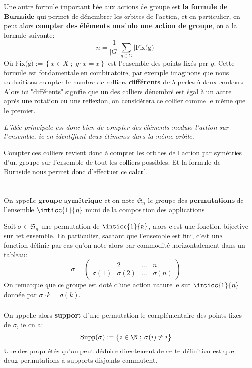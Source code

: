 \subsection*{}
Une autre formule important liée aux actions de groupe est \textbf{la formule de Burnside} qui permet de dénombrer les orbites de l'action, et en particulier, on peut alors \textbf{compter des éléments modulo une action de groupe}, on a la formule suivante:
\[ 
   n = \frac{1}{|G|} \sum_{g \in G} |\text{Fix(g)}| 
\]
Où \( \text{Fix(g)} := \left\{x \in X \; ; \; g \cdot x = x \right\}\) est l'ensemble des points fixés par \( g \). Cette formule est fondamentale en combinatoire, par exemple imaginons que nous souhaitions compter le nombre de colliers \textbf{différents} de 5 perles à deux couleurs. Alors ici "différents" signifie que un des colliers dénombré est égal à un autre aprés une rotation ou une reflexion, on considèrera ce collier comme le même que le premier. 
\begin{center}
   \textit{L'idée principale est donc bien de compter des éléments modulo l'action sur l'ensemble, ie en identifiant deux éléments dans la même orbite.}
\end{center}
Compter ces colliers revient donc à compter les orbites de l'action par symétries d'un groupe sur l'ensemble de tout les colliers possibles. Et la formule de Burnside nous permet donc d'effectuer ce calcul.
\chapter*{}
On appelle \textbf{groupe symétrique} et on note \(\mathfrak{S}_n\) le groupe des \textbf{permutations} de l'ensemble \(\inticc{1}{n}\) muni de la composition des applications.\<

Soit \(\sigma \in \mathfrak{S}_n\) une permutation de \(\inticc{1}{n}\), alors c'est une fonction bijective sur cet ensemble. En particulier, sachant que l'ensemble est fini, c'est une fonction définie par cas qu'on note alors par commodité horizontalement dans un tableau:
\[
   \sigma =  \begin{pmatrix}
      1 & 2 & \ldots & n\\
      \sigma(1) & \sigma(2) & \ldots & \sigma(n)
   \end{pmatrix}
\]
On remarque que ce groupe est doté d'une action naturelle sur \( \inticc{1}{n} \) donnée par \( \sigma \cdot k = \sigma(k) \).
\subsection*{}
On appelle alors \textbf{support} d'une permutation le complémentaire des points fixes de \(\sigma\), ie on a:
\[
   \text{Supp}(\sigma) := \bigl\{ i \in \N \; ; \; \sigma(i) \neq i \bigl\}   
\]
Une des propriétés qu'on peut déduire directement de cette définition est que deux permutations à supports disjoints commutent.
